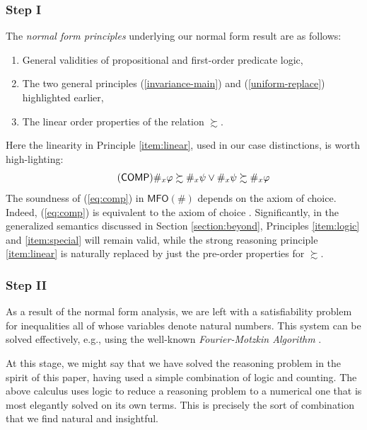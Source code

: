 \documentclass[12pt,oneside,reqno]{amsart}
\theoremstyle{definition}
\begin{document}
\subsubsection*{Step I} The \emph{normal form principles} underlying our normal form result are as follows:\vspace{0.5ex}
\begin{enumerate}[label=(\alph*)]
    \item General validities of propositional and first-order predicate logic, \label{item:logic}\vspace{0.5mm}
    \item The two general principles (\ref{invariance-main}) and (\ref{uniform-replace}) highlighted earlier, \label{item:special}\vspace{0.5mm}
    \item The linear order properties of the relation $\succsim$. \label{item:linear}\vspace{0.5ex}
\end{enumerate}
Here the linearity in Principle \ref{item:linear}, used in our case distinctions, is worth high-lighting: \vspace{1mm}
\begin{equation} \tag{$\mathsf{COMP}$} \#_x\varphi \succsim \#_x\psi \vee \#_x\psi \succsim \#_x\varphi \label{eq:comp}\vspace{1mm}
\end{equation}
The soundness of (\ref{eq:comp}) in $\mathsf{MFO}(\#)$ depends on the axiom of choice. Indeed, (\ref{eq:comp}) is equivalent to the axiom of choice \citep{Hartogs}. Significantly, in the generalized semantics discussed in Section \ref{section:beyond}, Principles \ref{item:logic} and \ref{item:special} will remain valid, 
while the strong reasoning principle \ref{item:linear} is naturally replaced by just the pre-order properties for $\succsim$.


\subsubsection*{Step II} As a result of the normal form analysis, we are left with a satisfiability problem for inequalities all of whose variables denote natural numbers. This system can be solved effectively, e.g., using the well-known \emph{Fourier-Motzkin Algorithm} \citep[\S12.2]{Schrijver}.

\vspace{1ex}

At this stage, we might say that we have solved the reasoning problem in the spirit of this paper, having used a simple combination of logic and counting. The above calculus uses logic to reduce a reasoning problem to a numerical one that is most elegantly solved on its own terms. This is precisely the sort of combination that we find natural and insightful.
\end{document}
